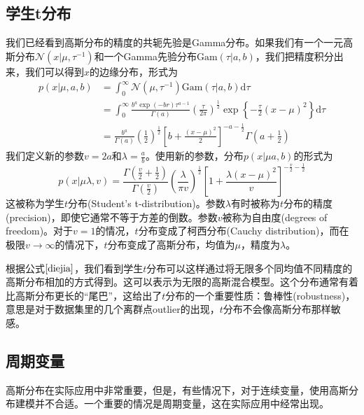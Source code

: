 \subsection*{学生t分布}
我们已经看到高斯分布的精度的共轭先验是Gamma分布。如果我们有一个一元高斯分布$\mathcal{N}(x|\mu,\tau^{-1})$和一个Gamma先验分布$\mathrm{Gam}(\tau|a,b)$，我们把精度积分出来，我们可以得到$x$的边缘分布，形式为
\begin{equation}
\label{diejia}
	\begin{aligned}
		p(x|\mu,a,b)&=\int_0^{\infty} \mathcal{N}(\mu,\tau^{-1})\mathrm{Gam}(\tau|a,b)\mathrm{d}\tau\\
		&=\int_0^{\infty}\frac{b^a\exp(-br)\tau^{a-1}}{\Gamma(a)}\left(\frac{\tau}{2\pi} \right)^{\frac{1}{2}}\exp\left\{-\frac{\tau}{2}(x-\mu)^2 \right\}\mathrm{d}\tau\\
		&=\frac{b^a}{\Gamma(a)}\left(\frac{1}{2}\right)^{\frac{1}{2}}\left[b+\frac{(x-\mu)^2}{2} \right]^{-a-\frac{1}{2}}\Gamma(a+\frac{1}{2})
	\end{aligned}
\end{equation}
我们定义新的参数$v=2a$和$\lambda=\frac{a}{b}$。使用新的参数，分布$p(x|\mu a,b)$的形式为
\begin{equation}
	p(x|\mu \lambda,v)=\frac{\Gamma(\frac{v}{2}+\frac{1}{2})}{\Gamma(\frac{v}{2})}\left(\frac{\lambda}{\pi v} \right)^{\frac{1}{2}}\left[1+\frac{\lambda(x-\mu)^2}{v} \right]^{-\frac{v}{2}-\frac{1}{2}}
\end{equation}
这被称为学生$t$分布(Student's t-distribution)。参数$\lambda$有时被称为$t$分布的精度(precision)，即使它通常不等于方差的倒数。参数$v$被称为自由度(degrees of freedom)。对于$v=1$的情况，$t$分布变成了柯西分布(Cauchy distribution)，而在极限$v\to \infty$的情况下，$t$分布变成了高斯分布，均值为$\mu$，精度为$\lambda$。

根据公式$\ref{diejia}$，我们看到学生$t$分布可以这样通过将无限多个同均值不同精度的高斯分布相加的方式得到。这可以表示为无限的高斯混合模型。这个分布通常有着比高斯分布更长的“尾巴”，这给出了$t$分布的一个重要性质：鲁棒性(robustness)，意思是对于数据集里的几个离群点outlier的出现，$t$分布不会像高斯分布那样敏感。
\subsection*{周期变量}
高斯分布在实际应用中非常重要，但是，有些情况下，对于连续变量，使用高斯分布建模并不合适。一个重要的情况是周期变量，这在实际应用中经常出现。

